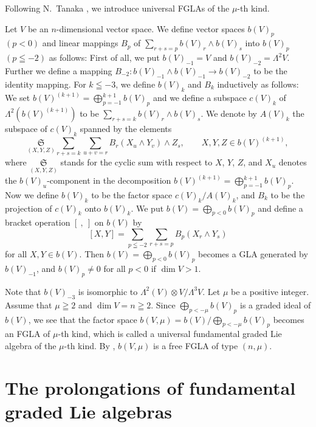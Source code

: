 Following N.~Tanaka \cite{tan70:1}, we introduce universal FGLAs of the
$\mu$-th kind.

Let $V$ be an $n$-dimensional vector space.
We def\/ine vector spaces $b(V)_p$ $(p<0)$ and li\-near mappings $B_p$ of
$\sum\limits_{r+s=p}b(V)_r\wedge b(V)_s$ into $b(V)_p$ $(p\leqq -2)$
as follows:
First of all, we put \mbox{$b(V)_{-1}=V$} and $b(V)_{-2}=\Lambda^2V$. Further
we def\/ine a mapping $B_{-2}:b(V)_{-1}\wedge b(V)_{-1}\to b(V)_{-2}$
to be the identity mapping. For $k\leqq-3$, we def\/ine $b(V)_k$ and
$B_k$ inductively as follows:
We set $b(V)^{(k+1)}=\bigoplus\limits_{p=-1}^{k+1}b(V)_p$ and
we def\/ine a subspace $c(V)_k$ of $\Lambda^2(b(V)^{(k+1)})$ to be
$\sum\limits_{r+s=k}b(V)_r\wedge b(V)_s$.
We denote by $A(V)_k$ the subspace of $c(V)_k$ spanned by the elements
\[
\underset{(X,Y,Z)}{\mathfrak S}\sum_{r+s=k}\sum_{u+v=r}B_r(X_u\wedge Y_v)\wedge Z_s,
\qquad  X,Y,Z\in b(V)^{(k+1)} ,
\]
where $\underset{(X,Y,Z)}{\mathfrak S}$ stands for the cyclic sum with respect to $X$, $Y$, $Z$, and $X_u$ denotes the $b(V)_u$-component in the decomposition
$b(V)^{(k+1)}=\bigoplus\limits_{p=-1}^{k+1}b(V)_p$.
Now we def\/ine $b(V)_k$ to be the factor space $c(V)_k/A(V)_k$, and
$B_k$ to be the projection of $c(V)_k$ onto $b(V)_k$.
We put $b(V)=\bigoplus\limits_{p<0}b(V)_p$ and def\/ine a bracket operation
$[\ , \ ]$ on $b(V)$ by
\[
[X,Y]=\sum_{p\leqq-2}\sum_{r+s=p}B_p(X_r\wedge Y_s)
\]
for all $X,Y\in b(V)$. Then $b(V)=\bigoplus\limits_{p<0}b(V)_p$ becomes a GLA generated by $b(V)_{-1}$, and $b(V)_p\ne0$ for all $p<0$ if $\dim V>1$.

Note that $b(V)_{-3}$ is isomorphic to $\Lambda^2(V)\otimes V/\Lambda^3V$.
Let $\mu$ be a positive integer. Assume that $\mu\geqq 2$ and $\dim V=n\geqq 2$.
Since $\bigoplus\limits_{p<-\mu}b(V)_p$ is a graded ideal of $b(V)$,
we see that the factor space $b(V,\mu)=b(V)/\bigoplus\limits_{p<-\mu}b(V)_p$
becomes an FGLA of $\mu$-th kind,
which is called a universal fundamental graded Lie algebra of the
$\mu$-th kind.
By \cite[Proposition~3.2]{tan70:1},
$b(V,\mu)$ is a free FGLA of type $(n,\mu)$.

\section{The prolongations of fundamental graded Lie algebras}\label{section4}

